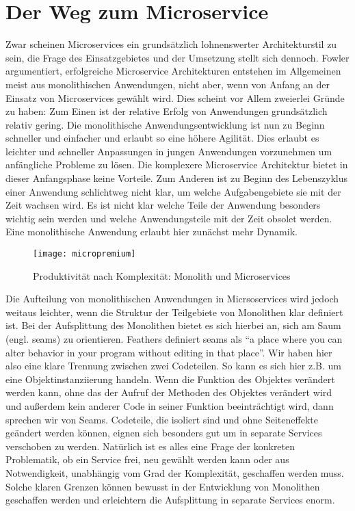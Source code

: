 \section{Der Weg zum Microservice}
Zwar scheinen Microservices ein grundsätzlich lohnenswerter Architekturstil zu sein, die Frage des Einsatzgebietes und der Umsetzung stellt sich dennoch. Fowler argumentiert\cite[][]{fowler:monolithfirst}, erfolgreiche Microservice Architekturen entstehen im Allgemeinen meist aus monolithischen Anwendungen, nicht aber, wenn von Anfang an der Einsatz von Microservices gewählt wird. Dies scheint vor Allem zweierlei Gründe zu haben: Zum Einen ist der relative Erfolg von Anwendungen grundsätzlich relativ gering. Die monolithische Anwendungsentwicklung ist nun zu Beginn schneller und einfacher und erlaubt so eine höhere Agilität. Dies erlaubt es leichter und schneller Anpassungen in jungen Anwendungen vorzunehmen um anfängliche Probleme zu lösen. Die komplexere Microservice Architektur bietet in dieser Anfangsphase keine Vorteile. Zum Anderen ist zu Beginn des Lebenszyklus einer Anwendung schlichtweg nicht klar, um welche Aufgabengebiete sie mit der Zeit wachsen wird. Es ist nicht klar welche Teile der Anwendung besonders wichtig sein werden und welche Anwendungsteile mit der Zeit obsolet werden. Eine monolithische Anwendung erlaubt hier zunächst mehr Dynamik.

\begin{figure}[!ht]
    \caption{Produktivität nach Komplexität: Monolith und Microservices \cite{fowler:micropremium}}
    \centering
    \label{fig:micrpremium}
    \texttt{[image: micropremium]}
\end{figure}

Die Aufteilung von monolithischen Anwendungen in Micrsoservices wird jedoch weitaus leichter, wenn die Struktur der Teilgebiete von Monolithen klar definiert ist. Bei der Aufsplittung des Monolithen bietet es sich hierbei an, sich am Saum (engl. seams) zu orientieren. Feathers definiert seams als ``a place where you can alter behavior in your program without editing in that place''.\cite[][Seite 29]{feathers2004working} Wir haben hier also eine klare Trennung zwischen zwei Codeteilen. So kann es sich hier z.B. um eine Objektinstanziierung handeln. Wenn die Funktion des Objektes verändert werden kann, ohne das der Aufruf der Methoden des Objektes verändert wird und außerdem kein anderer Code in seiner Funktion beeinträchtigt wird, dann sprechen wir von Seams. Codeteile, die isoliert sind und ohne Seiteneffekte geändert werden können, eignen sich besonders gut um in separate Services verschoben zu werden. Natürlich ist es alles eine Frage der konkreten Problematik, ob ein Service frei, neu gewählt werden kann oder aus Notwendigkeit, unabhängig vom Grad der Komplexität, geschaffen werden muss. Solche klaren Grenzen können bewusst in der Entwicklung von Monolithen geschaffen werden und erleichtern die Aufsplittung in separate Services enorm.

